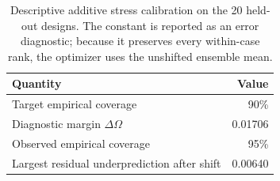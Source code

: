 \begin{table}[t]
\centering\small
\caption{Descriptive additive stress calibration on the 20 held-out designs. The constant is reported as an error diagnostic; because it preserves every within-case rank, the optimizer uses the unshifted ensemble mean.}
\label{tab:stress_calibration}
\begin{tabular}{lr}
\toprule
Quantity & Value \\
\midrule
Target empirical coverage & 90\% \\
Diagnostic margin $\Delta\Omega$ & 0.01706 \\
Observed empirical coverage & 95\% \\
Largest residual underprediction after shift & 0.00640 \\
\bottomrule
\end{tabular}
\end{table}
